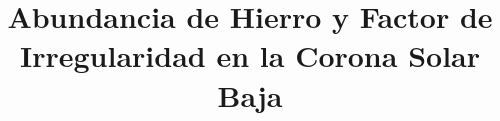 \documentclass[craaa]{baaa}
\begin{document}


\title{Abundancia de Hierro y Factor de Irregularidad en la Corona Solar Baja}

\end{document}
